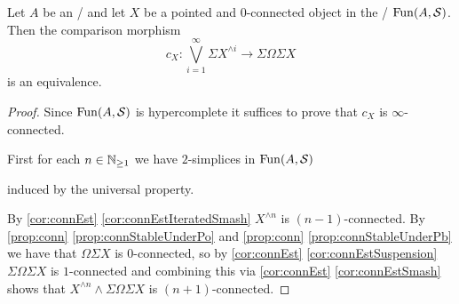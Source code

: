 \begin{prop}\label{prop:jamesSplittingPresheaf} %
    Let $A$ be an \inftycat/ and let $X$ be a pointed and $0$-connected object in the \inftytop/ $\operatorname{Fun}(A,\mathcal{S})$. %
    Then the comparison morphism 
    \begin{equation*}
        c_X\colon\bigvee\limits_{i=1}^{\infty}\Sigma X^{\wedge i}\to\Sigma\Omega\Sigma X
    \end{equation*}
    is an equivalence. 
    \begin{proof}
        Since $\operatorname{Fun}(A,\mathcal{S})$ is hypercomplete %
        it suffices to prove that $c_X$ is $\infty$-connected.

        First for each $n\in\mathbb{N}_{\geq 1}$ we have $2$-simplices in $\operatorname{Fun}(A,\mathcal{S})$
        \begin{center}
        \end{center}
        induced by the universal property.

        By \cref{cor:connEst} \ref{cor:connEstIteratedSmash} $X^{\wedge n}$ is $(n-1)$-connected.
        By \cref{prop:conn} \ref{prop:connStableUnderPo} and \cref{prop:conn} \ref{prop:connStableUnderPb} we have that $\Omega\Sigma X$ is $0$-connected, so by \cref{cor:connEst} \ref{cor:connEstSuspension} $\Sigma\Omega\Sigma X$ is $1$-connected and combining this via \cref{cor:connEst} \ref{cor:connEstSmash} shows that $X^{\wedge n}\wedge\Sigma\Omega\Sigma X$ is $(n+1)$-connected.


\end{proof}
\end{prop}
